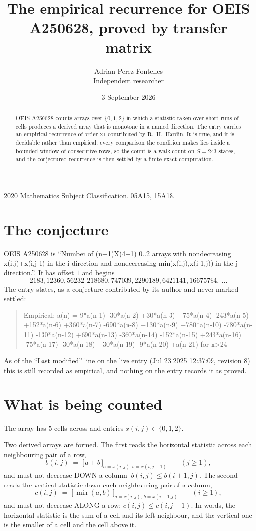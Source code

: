 \documentclass[11pt,a4paper]{article}
\title{The empirical recurrence for OEIS A250628, proved by transfer matrix}
\author{Adrian Perez Fontelles\\ \small Independent researcher}
\date{3 September 2026}
\theoremstyle{plain}
\theoremstyle{definition}
\begin{document}
\maketitle

\begin{abstract}
OEIS A250628 counts arrays over $\{0,1,2\}$ in which a statistic taken over short runs
of cells produces a derived array that is monotone in a named direction. The entry carries an
empirical recurrence of order $21$ contributed by R.~H.~Hardin. It is true, and it is
decidable rather than empirical: every comparison the condition makes lies inside a bounded
window of consecutive rows, so the count is a walk count on $S=243$ states, and the
conjectured recurrence is then settled by a finite exact computation.
\end{abstract}

\noindent\small 2020 Mathematics Subject Classification. 05A15, 15A18.\normalsize

\section{The conjecture}

OEIS A250628 is ``Number of (n+1)X(4+1) 0..2 arrays with nondecreasing x(i,j)+x(i,j-1) in the i direction and nondecreasing min(x(i,j),x(i-1,j)) in the j direction.''. It has offset $1$ and begins
\[
2183, 12360, 56232, 218680, 747039, 2290189, 6421141, 16675794,\ \dots
\]
The entry states, as a conjecture contributed by its author and never marked settled:
\begin{quote}
Empirical: a(n) = 9*a(n-1) -30*a(n-2) +30*a(n-3) +75*a(n-4) -243*a(n-5) +152*a(n-6) +360*a(n-7) -690*a(n-8) +130*a(n-9) +780*a(n-10) -780*a(n-11) -130*a(n-12) +690*a(n-13) -360*a(n-14) -152*a(n-15) +243*a(n-16) -75*a(n-17) -30*a(n-18) +30*a(n-19) -9*a(n-20) +a(n-21) for n>24
\end{quote}
As of the ``Last modified'' line on the live entry (Jul 23 2025 12:37:09, revision 8) this is still
recorded as empirical, and nothing on the entry records it as proved.

\section{What is being counted}

The array has $5$ cells across and entries $x(i,j)\in\{0,1,2\}$.

Two derived arrays are formed. The first reads the horizontal statistic across each
neighbouring pair of a row,
\[
b(i,j)\;=\;\bigl[\,a+b\,\bigr]_{a=x(i,j),\,b=x(i,j-1)}\qquad (j\ge1),
\]
and must not decrease DOWN a column: $b(i,j)\le b(i{+}1,j)$. The second reads the vertical
statistic down each neighbouring pair of a column,
\[
c(i,j)\;=\;\bigl[\,\min(a,b)\,\bigr]_{a=x(i,j),\,b=x(i{-}1,j)}\qquad (i\ge1),
\]
and must not decrease ALONG a row: $c(i,j)\le c(i,j{+}1)$. In words, the horizontal statistic
is the sum of a cell and its left neighbour, and the vertical one is
the smaller of a cell and the cell above it.
\end{document}
